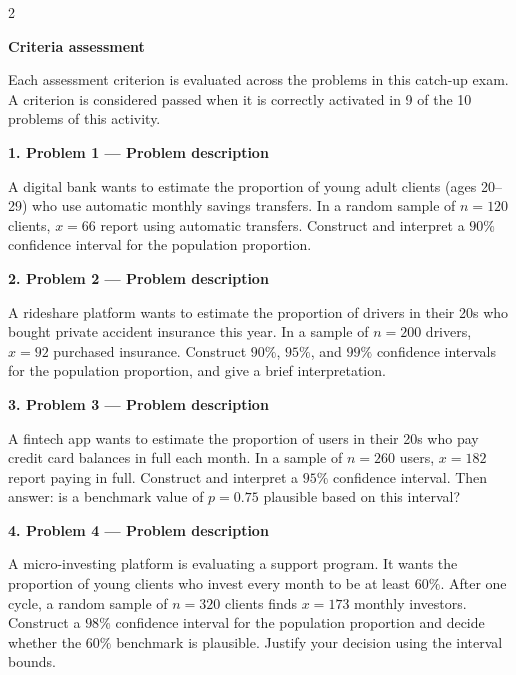 \documentclass[12pt]{article}
\newcommand{\SubsectionBox}[1]{%
\noindent\colorbox{gray!30}{\parbox{\linewidth}{\textbf{#1}}}\par\vspace{0.35cm}%
}
\begin{document}
\begin{multicols}{2}
	\SubsectionBox{Criteria assessment}\vspace{-0.25cm}
	Each assessment criterion is evaluated across the problems in this catch-up exam. A criterion is considered passed when it is correctly activated in 9 of the 10 problems of this activity.

	\vspace{0.25cm}
\SubsectionBox{1. Problem 1 --- Problem description}\vspace{-0.25cm}
A digital bank wants to estimate the proportion of young adult clients (ages 20--29) who use automatic monthly savings transfers. In a random sample of \(n=120\) clients, \(x=66\) report using automatic transfers. Construct and interpret a \(90\%\) confidence interval for the population proportion.

\vspace{0.25cm}
\SubsectionBox{2. Problem 2 --- Problem description}\vspace{-0.25cm}
A rideshare platform wants to estimate the proportion of drivers in their 20s who bought private accident insurance this year. In a sample of \(n=200\) drivers, \(x=92\) purchased insurance. Construct \(90\%\), \(95\%\), and \(99\%\) confidence intervals for the population proportion, and give a brief interpretation.

\vspace{0.25cm}
\SubsectionBox{3. Problem 3 --- Problem description}\vspace{-0.25cm}
A fintech app wants to estimate the proportion of users in their 20s who pay credit card balances in full each month. In a sample of \(n=260\) users, \(x=182\) report paying in full. Construct and interpret a \(95\%\) confidence interval. Then answer: is a benchmark value of \(p=0.75\) plausible based on this interval?

\vspace{0.25cm}
\SubsectionBox{4. Problem 4 --- Problem description}\vspace{-0.25cm}
A micro-investing platform is evaluating a support program. It wants the proportion of young clients who invest every month to be at least \(60\%\). After one cycle, a random sample of \(n=320\) clients finds \(x=173\) monthly investors. Construct a \(98\%\) confidence interval for the population proportion and decide whether the \(60\%\) benchmark is plausible. Justify your decision using the interval bounds.


\end{multicols}
\end{document}
